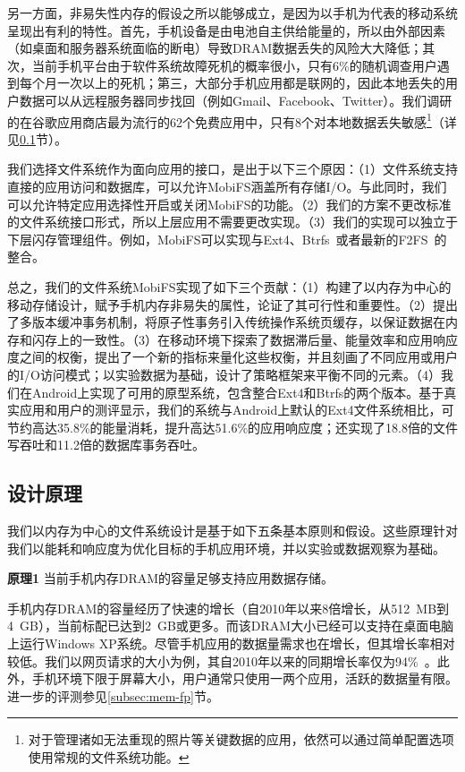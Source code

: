 另一方面，非易失性内存的假设之所以能够成立，是因为以手机为代表的移动系统呈现出有利的特性。首先，手机设备是由电池自主供给能量的，所以由外部因素（如桌面和服务器系统面临的断电）导致DRAM数据丢失的风险大大降低；其次，当前手机平台由于软件系统故障死机的概率很小，只有6\%的随机调查用户遇到每个月一次以上的死机；第三，大部分手机应用都是联网的，因此本地丢失的用户数据可以从远程服务器同步找回（例如Gmail、Facebook、Twitter）。我们调研的在谷歌应用商店最为流行的62个免费应用中，只有8个对本地数据丢失敏感\footnote{对于管理诸如无法重现的照片等关键数据的应用，依然可以通过简单配置选项使用常规的文件系统功能。}（详见\ref{subsec:insight}节）。

我们选择文件系统作为面向应用的接口，是出于以下三个原因：（1）文件系统支持直接的应用访问和数据库，可以允许MobiFS涵盖所有存储I/O。与此同时，我们可以允许特定应用选择性开启或关闭MobiFS的功能。（2）我们的方案不更改标准的文件系统接口形式，所以上层应用不需要更改实现。（3）我们的实现可以独立于下层闪存管理组件。例如，MobiFS可以实现与Ext4、Btrfs~\cite{Rodeh:2013:BLB:2501620.2501623}或者最新的F2FS~\cite{188454}的整合。

总之，我们的文件系统MobiFS实现了如下三个贡献：（1）构建了以内存为中心的移动存储设计，赋予手机内存非易失的属性，论证了其可行性和重要性。（2）提出了多版本缓冲事务机制，将原子性事务引入传统操作系统页缓存，以保证数据在内存和闪存上的一致性。（3）在移动环境下探索了数据滞后量、能量效率和应用响应度之间的权衡，提出了一个新的指标来量化这些权衡，并且刻画了不同应用或用户的I/O访问模式；以实验数据为基础，设计了策略框架来平衡不同的元素。（4）我们在Android上实现了可用的原型系统，包含整合Ext4和Btrfs的两个版本。基于真实应用和用户的测评显示，我们的系统与Android上默认的Ext4文件系统相比，可节约高达35.8\%的能量消耗，提升高达51.6\%的应用响应度；还实现了18.8倍的文件写吞吐和11.2倍的数据库事务吞吐。

\subsection{设计原理}
\label{subsec:insight}

我们以内存为中心的文件系统设计是基于如下五条基本原则和假设。这些原理针对我们以能耗和响应度为优化目标的手机应用环境，并以实验或数据观察为基础。

\textbf{原理1} 当前手机内存DRAM的容量足够支持应用数据存储。

手机内存DRAM的容量经历了快速的增长（自2010年以来8倍增长，从512~MB到4~GB），当前标配已达到2~GB或更多。而该DRAM大小已经可以支持在桌面电脑上运行Windows XP系统。尽管手机应用的数据量需求也在增长，但其增长率相对较低。我们以网页请求的大小为例，其自2010年以来的同期增长率仅为94\%~\cite{HTTP:Transfer:2013}。此外，手机环境下限于屏幕大小，用户通常只使用一两个应用，活跃的数据量有限。进一步的评测参见\ref{subsec:mem-fp}节。

